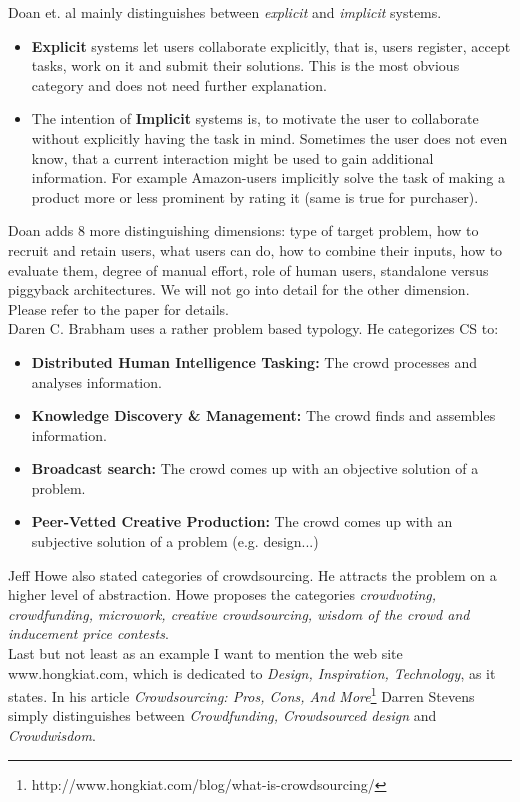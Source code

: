 \documentclass{acm_proc_article-sp}
\begin{document}
  Doan et. al \cite{doan:crowd} mainly distinguishes between \textit{explicit} and \textit{implicit} systems.
  \begin{itemize}
  \item \textbf{Explicit} systems let users collaborate explicitly, that is, users register, accept tasks, work on it and submit their solutions. This is the most obvious category and does not need further explanation.
  \item The intention of \textbf{Implicit} systems is, to motivate the user to collaborate without explicitly having the task in mind. Sometimes the user does not even know, that a current interaction might be used to gain additional information. For example Amazon-users implicitly solve the task of making a product more or less prominent by rating it (same is true for purchaser).
  \end{itemize}
  Doan adds 8 more distinguishing dimensions: type of target problem, how to recruit and retain users, what users can do, how to combine their inputs, how to evaluate them, degree of manual effort, role of human users, standalone versus piggyback architectures. We will not go into detail for the other dimension. Please refer to the paper for details.\\
  Daren C. Brabham\cite{brabham:crowd} uses a rather problem based typology. He categorizes CS to:
  \begin{itemize}
    \item \textbf{Distributed Human Intelligence Tasking:} The crowd processes and analyses information.
    \item \textbf{Knowledge Discovery \& Management:} The crowd finds and assembles information.
    \item \textbf{Broadcast search:} The crowd comes up with an objective solution of a problem.
    \item \textbf{Peer-Vetted Creative Production:} The crowd comes up with an subjective solution of a problem (e.g. design...)
  \end{itemize}
  Jeff Howe also stated categories of crowdsourcing. He attracts the problem on a higher level of abstraction. Howe proposes the categories \textit{crowdvoting, crowdfunding, microwork, creative crowdsourcing, wisdom of the crowd and inducement price contests}.\\
  Last but not least as an example I want to mention the web site www.hongkiat.com, which is dedicated to \textit{Design, Inspiration, Technology}, as it states. In his article \textit{Crowdsourcing: Pros, Cons, And More}\footnote{http://www.hongkiat.com/blog/what-is-crowdsourcing/} Darren Stevens simply distinguishes between \textit{Crowdfunding, Crowdsourced design} and \textit{Crowdwisdom}.
\end{document}
